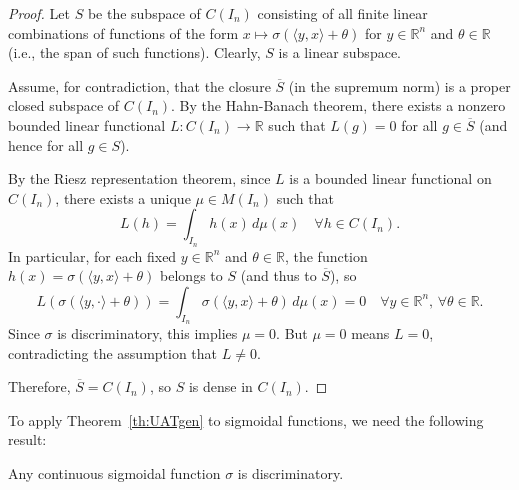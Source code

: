 \begin{proof}
Let \( S \) be the subspace of \( C(I_n) \) consisting of all finite linear combinations of functions of the form \( x \mapsto \sigma(\langle y, x \rangle + \theta) \) for \( y \in \mathbb{R}^n \) and \( \theta \in \mathbb{R} \) (i.e., the span of such functions). Clearly, \( S \) is a linear subspace.

Assume, for contradiction, that the closure \( \overline{S} \) (in the supremum norm) is a proper closed subspace of \( C(I_n) \). By the Hahn-Banach theorem, there exists a nonzero bounded linear functional \( L: C(I_n) \to \mathbb{R} \) such that \( L(g) = 0 \) for all \( g \in \overline{S} \) (and hence for all \( g \in S \)).

By the Riesz representation theorem, since \( L \) is a bounded linear functional on \( C(I_n) \), there exists a unique \( \mu \in M(I_n) \) such that
\[
L(h) = \int_{I_n} h(x) \, d\mu(x) \quad \forall h \in C(I_n).
\]
In particular, for each fixed \( y \in \mathbb{R}^n \) and \( \theta \in \mathbb{R} \), the function \( h(x) = \sigma(\langle y, x\rangle + \theta) \) belongs to \( S \) (and thus to \( \overline{S} \)), so
\[
L(\sigma(\langle y, \cdot \rangle + \theta)) = \int_{I_n} \sigma(\langle y, x \rangle+ \theta) \, d\mu(x) = 0 \quad \forall y \in \mathbb{R}^n, \, \forall \theta \in \mathbb{R}.
\]
Since \( \sigma \) is discriminatory, this implies \( \mu = 0 \). But \( \mu = 0 \) means \( L = 0 \), contradicting the assumption that \( L \neq 0 \).

Therefore, \( \overline{S} = C(I_n) \), so \( S \) is dense in \( C(I_n) \). 
\end{proof}


To apply Theorem~\ref{th:UATgen}  to sigmoidal functions, we need the following result:

\begin{lemma}  \label{le:UAT} Any continuous sigmoidal function \( \sigma \) is discriminatory.
\end{lemma}

